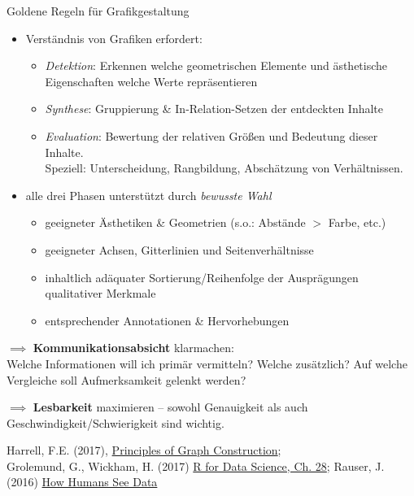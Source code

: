 \documentclass[
  10pt,
  ignorenonframetext,
]{beamer}
\providecommand{\tightlist}{%
  \setlength{\itemsep}{0pt}\setlength{\parskip}{0pt}}
\begin{document}
\begin{frame}{Goldene Regeln für Grafikgestaltung}
\label{goldene-regeln-fuxfcr-grafikgestaltung}
\begin{itemize}
\tightlist
\item
  Verständnis von Grafiken erfordert:

  \begin{itemize}
  \tightlist
  \item
    \emph{Detektion}: Erkennen welche geometrischen Elemente und
    ästhetische Eigenschaften welche Werte repräsentieren
  \item
    \emph{Synthese}: Gruppierung \& In-Relation-Setzen der entdeckten
    Inhalte
  \item
    \emph{Evaluation}: Bewertung der relativen Größen und Bedeutung
    dieser Inhalte.\\
    Speziell: Unterscheidung, Rangbildung, Abschätzung von
    Verhältnissen.
  \end{itemize}
\item
  alle drei Phasen unterstützt durch \emph{bewusste Wahl}

  \begin{itemize}
  \tightlist
  \item
    geeigneter Ästhetiken \& Geometrien (s.o.: Abstände \(>\) Farbe,
    etc.)
  \item
    geeigneter Achsen, Gitterlinien und Seitenverhältnisse
  \item
    inhaltlich adäquater Sortierung/Reihenfolge der Ausprägungen
    qualitativer Merkmale
  \item
    entsprechender Annotationen \& Hervorhebungen
  \end{itemize}
\end{itemize}

\(\implies\) \textbf{Kommunikationsabsicht} klarmachen:\\
Welche Informationen will ich primär vermitteln? Welche zusätzlich? Auf
welche Vergleiche soll Aufmerksamkeit gelenkt werden?

\(\implies\) \textbf{Lesbarkeit} maximieren -- sowohl Genauigkeit als
auch Geschwindigkeit/Schwierigkeit sind wichtig.

\scriptsize

Harrell, F.E. (2017),
\href{https://hbiostat.org/doc/graphscourse.pdf}{Principles of Graph
Construction};\\
Grolemund, G., Wickham, H. (2017)
\href{https://r4ds.had.co.nz/graphics-for-communication.html}{R for Data
Science, Ch. 28}; Rauser, J. (2016)
\href{https://www.youtube.com/watch?v=fSgEeI2Xpdc}{How Humans See Data}
\end{frame}
\end{document}
